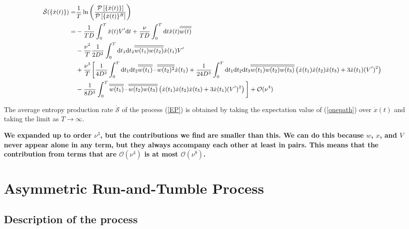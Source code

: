 \documentclass[%
 amsmath,amssymb,
]{revtex4-2}
\newcommand{\Overline}[1]{\overline{\overline{#1}}}
\newcommand{\rmd}[0]{\mathrm{d}}
\begin{document}
\begin{widetext}
\begin{equation}\small\label{onepath}
\begin{split}
 \dot{\mathcal{S}}(\{\dot{x}(t)\}) = & \frac{1}{T}\ln\left(\frac{\mathcal{P}\left[\{\dot{x}(t)\}\right]}{\mathcal{P}\left[\{\dot{x}(t)\}^R\right]}\right) \\= &  - \frac{1}{TD}\int^T_0 \dot{x}(t)V' \rmd t+ \frac{\nu}{TD}\int_0^T\rmd t\dot{x}(t)\Overline{w(t)} \\
 &- \frac{\nu^2}{T}\frac{1}{2D^2}\int^T_0 \rmd t_1 \rmd t_2 \Overline{w(t_1)w(t_2)}\dot{x}(t_1)V' \\
 &+ \frac{\nu^3}{T} \bigg[\frac{1}{4D^2} \int_0^T \rmd t_1 \rmd t_2 \Overline{w(t_1)}\cdot\Overline{w(t_2)^2}\dot{x}(t_1) + \frac{1}{24D^3}\int_0^T \rmd t_1 \rmd t_2 \rmd t_3 \Overline{w(t_1)w(t_2)w(t_3)}\left(\dot{x}(t_1)\dot{x}(t_2)\dot{x}(t_3) + 3\dot{x}(t_1)(V')^2\right)\\
  &- \frac{1}{8D^3}\int_0^T \Overline{w(t_1)}\cdot \Overline{w(t_2)w(t_3)}\left(\dot{x}(t_1)\dot{x}(t_2)\dot{x}(t_3)+ 3 \dot{x}(t_1)(V')^2\right)\bigg] + \mathcal{O}(\nu^4)
\end{split}
\end{equation}
\end{widetext}


The average entropy production rate $\dot{\mathcal{S}}$ of the process (\ref{EP}) is obtained by taking the expectation value of (\ref{onepath}) over $\dot{x}(t)$ and taking the limit as $T \rightarrow \infty$.

\textbf{We expanded up to order $\nu^3$, but the contributions we find are smaller than this. We can do this because $w$, $x$, and $V$ never appear alone in any term, but they always accompany each other at least in pairs. This means that the contribution from terms that are $\mathcal{O}(\nu^4)$ is at most $\mathcal{O}(\nu^8)$.}

\section{Asymmetric Run-and-Tumble Process}
\label{run_and_tumble}

\subsection{Description of the process}
\end{document}
